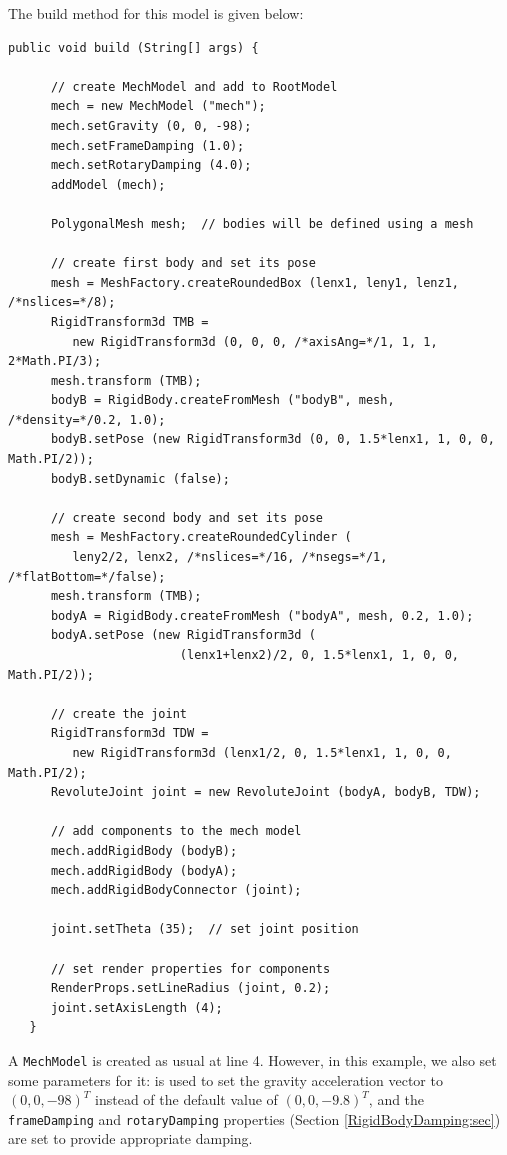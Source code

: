 The build method for this model is given below:
\lstset{numbers=left}
\begin{lstlisting}[]
   public void build (String[] args) {

      // create MechModel and add to RootModel
      mech = new MechModel ("mech");
      mech.setGravity (0, 0, -98);
      mech.setFrameDamping (1.0);
      mech.setRotaryDamping (4.0);
      addModel (mech);

      PolygonalMesh mesh;  // bodies will be defined using a mesh

      // create first body and set its pose
      mesh = MeshFactory.createRoundedBox (lenx1, leny1, lenz1, /*nslices=*/8);
      RigidTransform3d TMB = 
         new RigidTransform3d (0, 0, 0, /*axisAng=*/1, 1, 1, 2*Math.PI/3);
      mesh.transform (TMB);
      bodyB = RigidBody.createFromMesh ("bodyB", mesh, /*density=*/0.2, 1.0);
      bodyB.setPose (new RigidTransform3d (0, 0, 1.5*lenx1, 1, 0, 0, Math.PI/2));
      bodyB.setDynamic (false);

      // create second body and set its pose
      mesh = MeshFactory.createRoundedCylinder (
         leny2/2, lenx2, /*nslices=*/16, /*nsegs=*/1, /*flatBottom=*/false);
      mesh.transform (TMB);
      bodyA = RigidBody.createFromMesh ("bodyA", mesh, 0.2, 1.0);
      bodyA.setPose (new RigidTransform3d (
                        (lenx1+lenx2)/2, 0, 1.5*lenx1, 1, 0, 0, Math.PI/2));

      // create the joint      
      RigidTransform3d TDW = 
         new RigidTransform3d (lenx1/2, 0, 1.5*lenx1, 1, 0, 0, Math.PI/2);
      RevoluteJoint joint = new RevoluteJoint (bodyA, bodyB, TDW);

      // add components to the mech model
      mech.addRigidBody (bodyB);
      mech.addRigidBody (bodyA);
      mech.addRigidBodyConnector (joint);

      joint.setTheta (35);  // set joint position

      // set render properties for components
      RenderProps.setLineRadius (joint, 0.2);
      joint.setAxisLength (4);
   }
\end{lstlisting}
\lstset{numbers=none}

A {\tt MechModel} is created as usual at line 4. However, in this
example, we also set some parameters for it:
 is
used to set the gravity acceleration vector to $(0, 0, -98)^T$ instead
of the default value of $(0, 0, -9.8)^T$, and the {\tt frameDamping}
and {\tt rotaryDamping} properties (Section
\ref{RigidBodyDamping:sec}) are set to provide appropriate damping.

